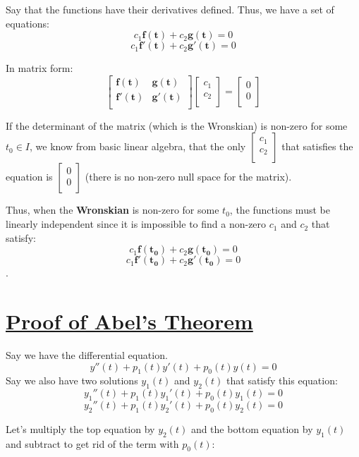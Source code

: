 \documentclass{report}
\begin{document}
Say that the functions have their derivatives defined. Thus, we have a set of equations:
$$c_1\bm{f(t)} + c_2\bm{g(t)} = 0$$ 
$$c_1\bm{f'(t)} + c_2\bm{g'(t)} = 0$$ 

In matrix form:
$$
\begin{bmatrix}
    \bm{f(t)} & \bm{g(t)} \\
    \bm{f'(t)} & \bm{g'(t)} \\
\end{bmatrix}
\begin{bmatrix}
    c_1 \\
    c_2 \\
\end{bmatrix}
=
\begin{bmatrix}
    0 \\
    0 \\
\end{bmatrix}
$$

If the determinant of the matrix (which is the Wronskian) is non-zero for some $t_0 \in I$, we know from basic linear algebra, that the only $\begin{bmatrix}
    c_1 \\
    c_2 \\
\end{bmatrix}$ that satisfies the equation is $\begin{bmatrix}
    0 \\
    0 \\
\end{bmatrix}$ (there is no non-zero null space for the matrix).

Thus, when the \textbf{Wronskian} is non-zero for some $t_0$, the functions must be linearly independent since it is impossible to find a non-zero $c_1$ and $c_2$ that satisfy:
$$c_1\bm{f(t_0)} + c_2\bm{g(t_0)} = 0$$
$$c_1\bm{f'(t_0)} + c_2\bm{g'(t_0)} = 0$$.






\section{\hyperref[th:abel_thm]{Proof of Abel's Theorem}}
\label{sec:abel}
Say we have the differential equation.
$$y''(t) + p_1(t)y'(t) + p_0(t)y(t) = 0$$
Say we also have two solutions $y_1(t)$ and $y_2(t)$ that satisfy this equation:
$$y_1''(t) + p_1(t)y_1'(t) + p_0(t)y_1(t) = 0$$
$$y_2''(t) + p_1(t)y_2'(t) + p_0(t)y_2(t) = 0$$

Let's multiply the top equation by $y_2(t)$ and the bottom equation by $y_1(t)$ and subtract to get rid of the term with $p_0(t)$:
\end{document}
